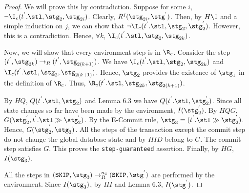 \begin{proof}
We will prove this by contradiction. Suppose for some $i$, $\neg \I_c(t^{'}.\stl, \stg_2, \stg_{2i})$. Clearly, $R^{j}(\stg_{2i}, \stg^{'})$. Then, by $H\I$ and a simple induction on $j$, we can show that $\neg \I_c(t^{'}.\stl, \stg_2, \stg_{2}^{'})$. However, this is a contradiction. Hence, $\forall k$, $\I_c(t^{'}.\stl, \stg_2, \stg_{2k})$.

Now, we will show that every environment step is in $\R_c$. Consider the step $(t^{'}, \stg_{2k}) \rightarrow_R (t^{'}, \stg_{2(k+1)})$. We have $\I_c(t^{'}.\stl, \stg_2, \stg_{2k})$ and $\I_c(t^{'}.\stl, \stg_2, \stg_{2(k+1)})$. Hence, $\stg_2$ provides the existence of $\stg_1$ in the definition of $\R_c$. Thus, $\R_c(t^{'}.\stl, \stg_{2k}, \stg_{2(k+1)})$.

By $HQ$, $Q(t^{'}.\stl, \stg_2)$ and Lemma 6.3 we have $Q(t^{'}.\stl, \stg_{2}^{'})$. Since all state changes so far have been made by the environment, $I(\stg_{2}^{'})$. By $HQG$, $G(\stg_{2}^{'}, t^{'}.\stl \gg \stg_{2}^{'})$. By the E-Commit rule, $\stg_3 = (t^{'}.\stl \gg \stg_{2}^{'})$. Hence, $G(\stg_{2}^{'}, \stg_3)$. All the steps of the transaction except the commit step do not change the global database state and by $HID$ belong to $G$. The commit step satisfies $G$. This proves the \texttt{step-guaranteed} assertion. Finally, by $HG$, $I(\stg_3)$.


All the steps in $(\texttt{SKIP}, \stg_3) \rightarrow_{R}^{n_4} (\texttt{SKIP}, \stg^{'})$ are performed by the environment. Since $I(\stg_3)$, by $HI$ and Lemma 6.3, $I(\stg^{'})$.
\end{proof}


